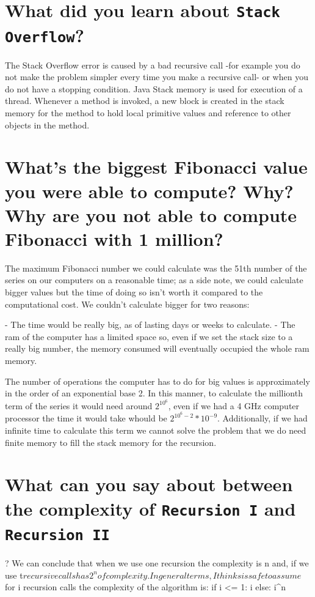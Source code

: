 \documentclass[a4paper,12pt]{article}
\begin{document}
    \section{What did you learn about \texttt{Stack Overflow}?}
      The Stack Overflow error is caused by a bad recursive call -for example you do not make
      the problem simpler every time you make a recursive call- or when you do not have a stopping
      condition.\cite{StackOverflow} Java Stack memory is used for execution of a thread.
      Whenever a method is invoked, a new block is created in the stack memory for the method to hold
      local primitive values and reference to other objects in the method.\cite{HeapStack}
    \section{What's the biggest Fibonacci value you were able to compute? Why? Why are you not able to compute Fibonacci with 1 million?}
    The maximum Fibonacci number we could calculate was the 51th number of the series on our computers on
    a reasonable time; as a side note, we could calculate bigger values but the time of doing so isn't worth
    it compared to the computational cost. We couldn't calculate bigger for two reasons:

    - The time would be really big, as of lasting days or weeks to calculate.
    - The ram of the computer has a limited space so, even if we set the stack size to a really big
    number, the memory consumed will eventually occupied the whole ram memory.

    The number of operations the computer has to do for big values is approximately in the order of
    an exponential base 2. In this manner, to calculate the millionth term of the series it would need
    around $2^{10^6}$, even if we had a 4 GHz computer processor the time it would take whould be
    $2^{10^6-2}*10^{-9}$. Additionally, if we had infinite time to calculate this term we cannot solve the
    problem that we do need finite memory to fill the stack memory for the recursion.

    \section{What can you say about between the complexity of \texttt{Recursion I} and \texttt{Recursion II}}?
    We can conclude that when we use one recursion the complexity is n and, if we use t$
recursive calls has 2^n of complexity. In general terms, I thinks is safe to assume$
for i recursion calls the complexity of the algorithm is:
        if i <= 1: i
        else:      i^n
    \newpage
    
    
\end{document}
